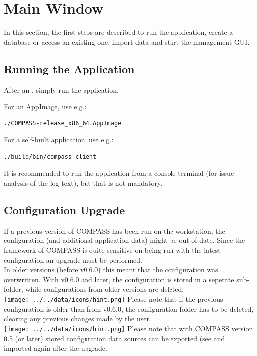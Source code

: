 \chapter{Main Window}
\label{sec:main_window} 

In this section, the first steps are described to run the application, create a database or access an existing one, import data and start the management GUI.

\section{Running the Application}

After an , simply run the application.

For an AppImage, use e.g.:
\begin{lstlisting}
./COMPASS-release_x86_64.AppImage
\end{lstlisting}

For a self-built application, use e.g.:
\begin{lstlisting}
./build/bin/compass_client
\end{lstlisting}

It is recommended to run the application from a console terminal (for issue analysis of the log text), but that is not mandatory.

\section{Configuration Upgrade}

If a previous version of COMPASS has been run on the workstation, the configuration (and additional application data) might be out of date. Since the framework of COMPASS is quite sensitive on being run with the latest configuration an upgrade must be performed. \\

In older versions (before v0.6.0) this meant that the configuration was overwritten. With v0.6.0 and later, the configuration is stored in a seperate sub-folder, while configurations from older versions are deleted. \\

\texttt{[image: ../../data/icons/hint.png]} Please note that if the previous configuration is older than from v0.6.0, the configuration folder has to be deleted, clearing any previous changes made by the user. \\

\texttt{[image: ../../data/icons/hint.png]} Please note that with COMPASS version 0.5 (or later) stored configuration data sources can be exported (see  and imported again after the upgrade. \\

